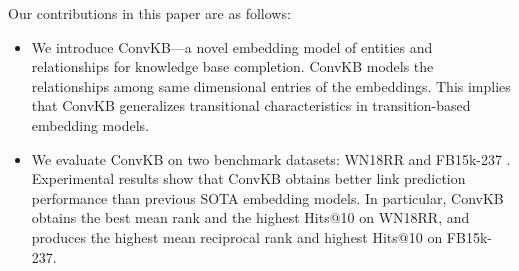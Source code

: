 \documentclass[11pt,a4paper]{article}
\begin{document}
Our contributions in this paper are as follows:
\begin{itemize}


\item We introduce ConvKB---a novel embedding model of entities and relationships for knowledge base completion. 
ConvKB models the relationships among same dimensional entries of the embeddings. This implies that ConvKB generalizes transitional characteristics in  transition-based embedding  models.

\item We evaluate ConvKB  on two benchmark datasets: WN18RR \citep{Dettmers2017} and FB15k-237 \citep{toutanova-chen:2015:CVSC}.  Experimental results show that ConvKB obtains better link prediction performance than previous SOTA embedding models. In particular,   ConvKB obtains the best mean rank  and the highest Hits@10 on WN18RR, and produces the highest mean reciprocal rank and  highest Hits@10 on FB15k-237. 

\end{itemize}


\begin{table}[!t]
\centering
\setlength{\tabcolsep}{0.4em}
\def\arraystretch{1.05}
\caption{The score functions in previous SOTA  models and in our ConvKB model. $\|\boldsymbol{v}\|_p$ denotes the $p$-norm of $\boldsymbol{v}$. $\langle\boldsymbol{v}_h,\boldsymbol{v}_r,\boldsymbol{v}_t\rangle$ = $\sum_i\boldsymbol{v}_{h_i}\boldsymbol{v}_{r_i}\boldsymbol{v}_{t_i}$ denotes a tri-linear dot product. $g$ denotes a non-linear function. $\ast$ denotes a convolution operator. $\cdot$ denotes a dot product. $\mathsf{concat}$ denotes a concatenation operator. $\widehat{\boldsymbol{v}}$ denotes a 2D reshaping of $\boldsymbol{v}$. $\bold{\Omega}$ denotes a set of filters.}
\label{tab:scorefunctions}
\end{table}
\end{document}
